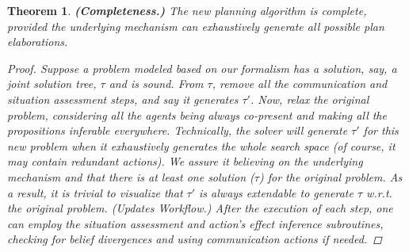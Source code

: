 \documentclass[letterpaper]{article} %
\newtheorem{theorem}{Theorem}[section]
\begin{document}
\begin{theorem}
\textbf{(Completeness.)} The new planning algorithm is complete, provided the underlying mechanism can exhaustively generate all possible plan elaborations. 
\vspace{-0.06in}
\begin{proof}
Suppose a problem modeled based on our formalism has a solution, say, a joint solution tree, $\tau$ and is sound. 
From $\tau$, remove all the communication and situation assessment steps, and say it generates $\tau'$. Now, relax the original problem, considering all the agents being always co-present and making all the propositions \textit{inferable} everywhere. 
Technically, the solver will generate $\tau'$ for this new problem when it exhaustively generates the whole search space (of course, it may contain redundant actions). 
We assure it believing on the underlying mechanism and that there is at least one solution ($\tau$) for the original problem. As a result, it is trivial to visualize that $\tau'$ is always extendable to generate $\tau$ w.r.t. the original problem. (\textit{Updates Workflow}.) After the execution of each step, one can employ the situation assessment and action's effect inference subroutines, checking for belief divergences and using communication actions if needed. 
\end{proof}
\end{theorem}
\end{document}
